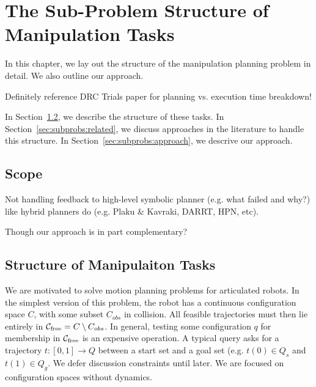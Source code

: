 \chapter{The Sub-Problem Structure of Manipulation Tasks}
\label{chap:formulation}

In this chapter,
we lay out the structure of the manipulation planning problem
in detail.
We also outline our approach.

Definitely reference DRC Trials paper for planning vs. execution
time breakdown!

In Section~\ref{sec:subprobs:structure},
we describe the structure of these tasks.
In Section~\ref{sec:subprobs:related},
we discuss approaches in the literature
to handle this structure.
In Section~\ref{sec:subprobs:approach},
we descrive our approach.

\section{Scope}

Not handling feedback to high-level symbolic planner
(e.g. what failed and why?)
like hybrid planners do
(e.g. Plaku \& Kavraki, DARRT, HPN, etc).

Though our approach is in part complementary?

\section{Structure of Manipulaiton Tasks}
\label{sec:subprobs:structure}

We are motivated to solve motion planning problems for articulated robots.
In the simplest version of this problem,
the robot has a continuous configuration space $C$,
with some subset $C_{obs}$ in collision.
All feasible trajectories must then lie entirely in
$\mathcal{C}_{\mbox{\scriptsize free}} = C \setminus C_{obs}$.
In general, testing some configuration $q$ for membership in
$\mathcal{C}_{\mbox{\scriptsize free}}$
is an expensive operation.
A typical query asks for a trajectory $t: [0,1] \rightarrow Q$ between
a start set and a goal set (e.g. $t(0) \in Q_s$ and $t(1) \in Q_g$.
We defer discussion constraints until later.
We are focused on configuration spaces without dynamics.

